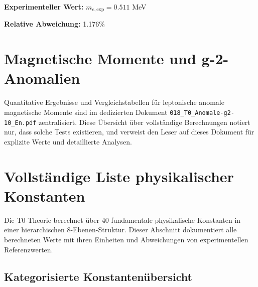 	\textbf{Experimenteller Wert:} $m_{e,\text{exp}} = 0.511$ MeV
	
	\textbf{Relative Abweichung:} 1.176\%
	
	\section{Magnetische Momente und g-2-Anomalien}
	
	Quantitative Ergebnisse und Vergleichstabellen für leptonische anomale magnetische Momente sind
	im dedizierten Dokument \texttt{018\_T0\_Anomale-g2-10\_En.pdf} zentralisiert.
	Diese Übersicht über vollständige Berechnungen notiert nur, dass solche Tests existieren, und verweist den Leser
	auf dieses Dokument für explizite Werte und detaillierte Analysen.
	
	\section{Vollständige Liste physikalischer Konstanten}
	
	Die T0-Theorie berechnet über 40 fundamentale physikalische Konstanten in einer hierarchischen 8-Ebenen-Struktur. Dieser Abschnitt dokumentiert alle berechneten Werte mit ihren Einheiten und Abweichungen von experimentellen Referenzwerten.
	
	\subsection{Kategorisierte Konstantenübersicht}
	
	\begin{table}[h]
		\centering
		\caption{Kategoriebasierte Fehlerstatistik der T0-Konstantenberechnungen}
	\end{table}
	
